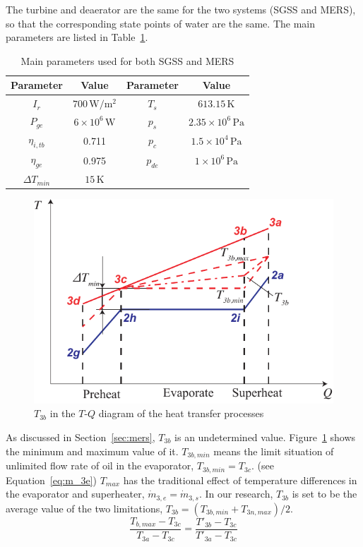The turbine and deaerator are the same for the two systems (SGSS and MERS), so that the corresponding state points of water are the same. The main parameters are listed in Table~\ref{tab:ptc}.
\begin{table}[htbp]
	\caption{Main parameters used for both SGSS and MERS}
	\begin{center}
	\begin{tabular}{cccc}
		\toprule
		Parameter		&	Value	&	Parameter		&	Value\\
		\midrule
		$I_r$	&	$700\,\mathrm{W/m^2}$	&	$T_s$		&	$613.15\,\mathrm{K}$\\
		$P_{ge}$	&	$6\times 10^6\,\mathrm{W}$	&	$p_s$		&	$2.35\times 10^6\,\mathrm{Pa}$\\
		$\eta_{i,tb}$	&	0.711	&	$p_c$		&	$1.5\times 10^4\,\mathrm{Pa}$\\
		$\eta_{ge}$	&	0.975	&	$p_{de}$		&	$1\times 10^6\,\mathrm{Pa}$\\
		$\Delta T_{min}$	&	$15\,\mathrm{K}$	&	&\\		
		\bottomrule
	\end{tabular}
	\end{center}
	\label{tab:ptc}
\end{table}
\noindent \begin{figure}[htbp]
\begin{center}
	\includegraphics[width = 0.7\columnwidth]{fig/T3b}
	\caption{$T_{3b}$ in the $T$-$Q$ diagram of the heat transfer processes}
	\label{fig:T3b}
\end{center}
\end{figure}

As discussed in Section~\ref{sec:mers}, $T_{3b}$ is an undetermined value. Figure~\ref{fig:T3b} shows the minimum and maximum value of it. $T_{3b,min}$ means the limit situation of unlimited flow rate of oil in the evaporator, $T_{3b,min} = T_{3c}$. (see Equation~\ref{eq:m_3e}) $T_{max}$ has the traditional effect of temperature differences in the evaporator and superheater, $\dot{m}_{3,e} = \dot{m}_{3,s}$. In our research, $T_{3b}$ is set to be the average value of the two limitations, $T_{3b} = (T_{3b,min} + T_{3n,max}) / 2$.
\begin{equation}
  \dfrac{T_{b,max}-T_{3c}}{T_{3a} - T_{3c}} = \dfrac{T'_{3b} - T_{3c}}{T'_{3a} - T_{3c}}
\end{equation}

